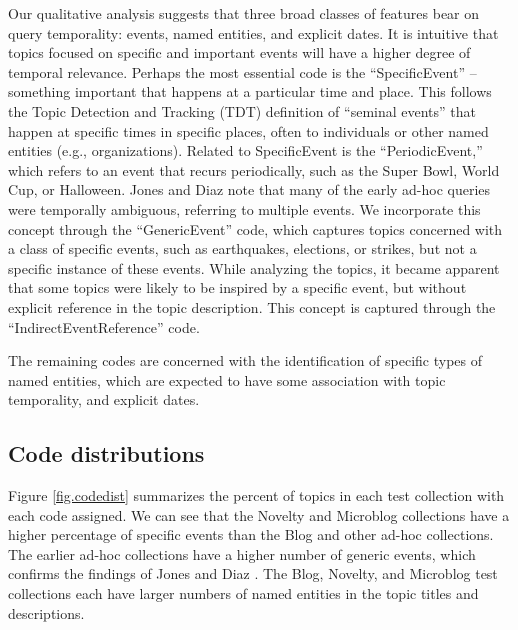 \documentclass{asist}
\begin{document}
Our qualitative analysis suggests that three broad classes of features bear on query temporality: events, named entities, and explicit dates. It is intuitive that topics focused on specific and important events will have a higher degree of temporal relevance. Perhaps the most essential code is the ``SpecificEvent'' -- something important that happens at a particular time and place.  This follows the Topic Detection and Tracking (TDT) definition \cite{TDT2004} of ``seminal events'' that happen at specific times in specific places, often to individuals or other named entities (e.g., organizations).  Related to SpecificEvent is the ``PeriodicEvent,'' which refers to an event that recurs periodically, such as the Super Bowl, World Cup, or Halloween. Jones and Diaz \cite{Jones2007} note that many of the early ad-hoc queries were temporally ambiguous, referring to multiple events. We incorporate this concept through the ``GenericEvent'' code, which captures topics concerned with a class of specific events, such as earthquakes, elections, or strikes, but not a specific instance of these events.  While analyzing the topics, it became apparent that some topics were likely to be inspired by a specific event, but without explicit reference in the topic description. This concept is captured through the ``IndirectEventReference'' code. 
 
 
The remaining codes are concerned with the identification of specific types of named entities, which are expected to have some  association with topic temporality, and explicit dates.


\subsection{Code distributions}

Figure \ref{fig.codedist} summarizes the percent of topics in each test collection with each code assigned. We can see that the Novelty and Microblog  collections have a higher percentage of specific events than the Blog and other ad-hoc collections. The earlier ad-hoc collections have a higher number of generic events, which confirms the findings of Jones and Diaz \cite{Jones2007}. The Blog, Novelty, and Microblog test collections each have larger numbers of named entities in the topic titles and descriptions.
\end{document}
